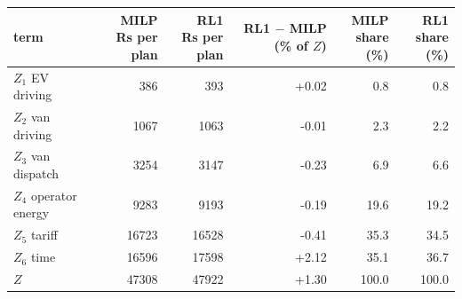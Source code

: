 \begin{tabular}{@{}lrrrrr@{}}
\toprule
term & \shortstack[r]{MILP\\Rs per plan} & \shortstack[r]{RL1\\Rs per plan} & \shortstack[r]{RL1 $-$ MILP\\(\% of $Z$)} & \shortstack[r]{MILP\\share (\%)} & \shortstack[r]{RL1\\share (\%)} \\
\midrule
$Z_1$ EV driving & 386 & 393 & +0.02 & 0.8 & 0.8 \\
$Z_2$ van driving & 1067 & 1063 & -0.01 & 2.3 & 2.2 \\
$Z_3$ van dispatch & 3254 & 3147 & -0.23 & 6.9 & 6.6 \\
$Z_4$ operator energy & 9283 & 9193 & -0.19 & 19.6 & 19.2 \\
$Z_5$ tariff & 16723 & 16528 & -0.41 & 35.3 & 34.5 \\
$Z_6$ time & 16596 & 17598 & +2.12 & 35.1 & 36.7 \\
\midrule
$Z$ & 47308 & 47922 & +1.30 & 100.0 & 100.0 \\
\bottomrule
\end{tabular}
